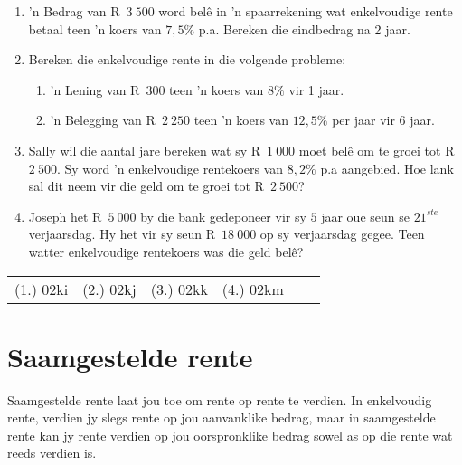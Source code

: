 \begin{exercises}{}
{
    \begin{enumerate}[label=\textbf{\arabic*}.]
	\item ’n Bedrag van R~$3~500$ word belê in ’n spaarrekening wat enkelvoudige rente betaal teen ’n koers van $7,5\%$ p.a. Bereken die eindbedrag na 2 jaar.

	\item Bereken die enkelvoudige rente in die volgende probleme:
	\begin{enumerate}[noitemsep, label=\textbf{(\alph*)} ]
	    \item ’n Lening van R~$300$  teen ’n koers van $8\%$ vir 1 jaar.

	    \item ’n Belegging van R~$2~250$ teen ’n koers van $12,5\%$ per jaar vir 6 jaar.
	\end{enumerate}

	\item Sally wil die aantal jare bereken wat sy R~$1~000$ moet bel\^e om te groei tot R~$2~500$. Sy word 'n enkelvoudige rentekoers van $8,2\%$ p.a aangebied. Hoe lank sal dit neem vir die geld om te groei tot R~$2~500$?
	\item Joseph het R~$5~000$ by die bank gedeponeer vir sy $5$ jaar oue seun se $21^{ste}$ verjaarsdag. Hy het vir sy seun R~$18~000$ op sy verjaarsdag gegee. Teen watter enkelvoudige rentekoers was die geld belê?
    \end{enumerate}

\par \practiceinfo
\par \begin{tabular}[h]{cccccc}
(1.)	02ki	&
(2.)	02kj	&
(3.)	02kk	&
(4.)	02km	&
\end{tabular}
}
\end{exercises}






\section{Saamgestelde rente}

Saamgestelde rente laat jou toe om rente op rente te verdien. In enkelvoudig rente, verdien jy slegs rente op jou aanvanklike bedrag, maar in saamgestelde rente kan jy rente verdien op jou oorspronklike bedrag sowel as op die rente wat reeds verdien is.\par

